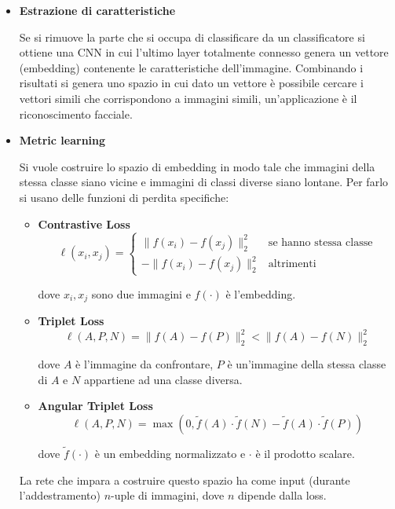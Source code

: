 \documentclass{article}
\begin{document}
\begin{itemize}
\begin{itemize}
        \end{itemize}

    \item \textbf{Estrazione di caratteristiche}

        Se si rimuove la parte che si occupa di classificare da un classificatore si ottiene una CNN in cui l'ultimo layer totalmente connesso genera un vettore (embedding) contenente le caratteristiche dell'immagine. Combinando i risultati si genera uno spazio in cui dato un vettore è possibile cercare i vettori simili che corrispondono a immagini simili, un'applicazione è il riconoscimento facciale.

    \item \textbf{Metric learning}

        Si vuole costruire lo spazio di embedding in modo tale che immagini della stessa classe siano vicine e immagini di classi diverse siano lontane. Per farlo si usano delle funzioni di perdita specifiche:

    \begin{itemize}
        \item \textbf{Contrastive Loss}
        \[
        \ell(x_i,x_j)=
        \begin{cases}
        \|f(x_i)-f(x_j)\|_2^2 & \text{se hanno stessa classe}\\
        -\|f(x_i)-f(x_j)\|_2^2 & \text{altrimenti}
        \end{cases}
        \]
    
        dove $x_i,x_j$ sono due immagini e $f(\cdot)$ è l'embedding.
    
        \item \textbf{Triplet Loss}
        \[
        \ell(A,P,N)=
        \|f(A)-f(P)\|_2^2<\|f(A)-f(N)\|_2^2
        \]
    
        dove $A$ è l'immagine da confrontare, $P$ è un'immagine della stessa classe di $A$ e $N$ appartiene ad una classe diversa. 
    
        \item \textbf{Angular Triplet Loss}
        \[
        \ell(A,P,N)=
        \max\!\left(
        0,
        \tilde f(A)\cdot\tilde f(N)-
        \tilde f(A)\cdot\tilde f(P)
        \right)
        \]
    
        dove $\tilde f(\cdot)$ è un embedding normalizzato e $\cdot$ è il prodotto scalare.
    \end{itemize}

    La rete che impara a costruire questo spazio ha come input (durante l'addestramento) $n$-uple di immagini, dove $n$ dipende dalla loss.


\end{itemize}
\end{document}
